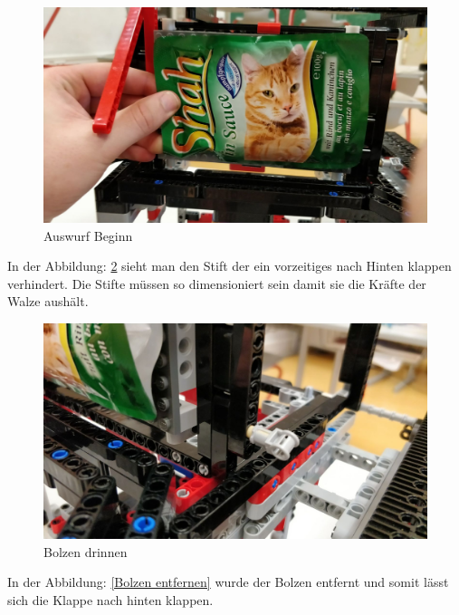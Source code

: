 \begin{figure}[H]
\begin{center}
\includegraphics[width=13cm]{Bilder/Ablauf_1_png/Auswurf_1}
\caption{Auswurf Beginn}
\label{Auswurf Beginn}
\end{center}
\end{figure}

In der Abbildung: \ref{Bolzen drinnen} sieht man den Stift der ein vorzeitiges nach Hinten klappen verhindert. Die Stifte müssen so dimensioniert sein damit sie die Kräfte der Walze aushält.

\begin{figure}[H]
\begin{center}
\includegraphics[width=13cm]{Bilder/Ablauf_1_png/Auswurf_2}
\caption{Bolzen drinnen}
\label{Bolzen drinnen}
\end{center}
\end{figure}


In der Abbildung: \ref{Bolzen entfernen} wurde der Bolzen entfernt und somit lässt sich die Klappe nach hinten klappen.

